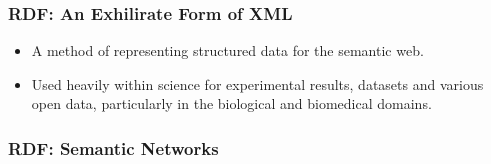 \documentclass[aspectratio=169]{beamer} %
\begin{document}
\begin{frame}
\frametitle{RDF: An Exhilirate Form of XML}

\begin{itemize}
  \item A method of representing structured data for the semantic web.
  \item Used heavily within science for experimental results, datasets and
  various open data, particularly in the biological and biomedical domains.
\end{itemize}

\end{frame}

\begin{frame}
\frametitle{RDF: Semantic Networks}
\end{frame}
\end{document}
